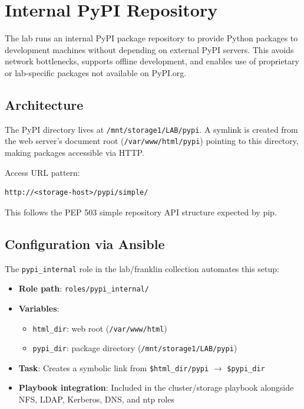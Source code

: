 \section{Internal PyPI Repository}

The lab runs an internal PyPI package repository to provide Python packages to development machines without depending on external PyPI servers. This avoids network bottlenecks, supports offline development, and enables use of proprietary or lab-specific packages not available on PyPI.org.

\subsection{Architecture}

The PyPI directory lives at \texttt{/mnt/storage1/LAB/pypi}. A symlink is created from the web server's document root (\texttt{/var/www/html/pypi}) pointing to this directory, making packages accessible via HTTP.

Access URL pattern:
\begin{lstlisting}[style=mystyle]
http://<storage-host>/pypi/simple/
    \end{lstlisting}

This follows the PEP 503 simple repository API structure expected by pip.

\subsection{Configuration via Ansible}

The \texttt{pypi\_internal} role in the lab/franklin collection automates this setup:

\begin{itemize}
    \item \textbf{Role path}: \texttt{roles/pypi\_internal/}
    
    \item \textbf{Variables}:
    \begin{itemize}
        \item \texttt{html\_dir}: web root (\texttt{/var/www/html})
        \item \texttt{pypi\_dir}: package directory (\texttt{/mnt/storage1/LAB/pypi})
    \end{itemize}
    
    \item \textbf{Task}: Creates a symbolic link from \texttt{\$html\_dir/pypi} $\rightarrow$ \texttt{\$pypi\_dir}
    
    \item \textbf{Playbook integration}: Included in the cluster/storage playbook alongside NFS, LDAP, Kerberos, DNS, and ntp roles
\end{itemize}

